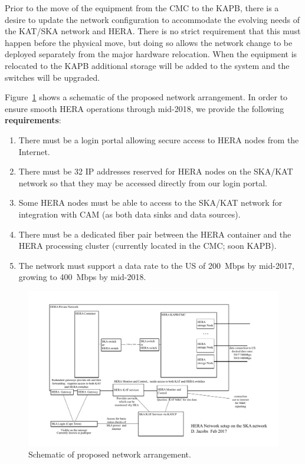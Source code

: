 \documentclass{article}
\begin{document}
Prior to the move of the equipment from the CMC to the KAPB, there is a desire
to update the network configuration to accommodate the evolving needs of the
KAT/SKA network and HERA.  There is no strict requirement that this must
happen before the physical move, but doing so allows the network change to be
deployed separately from the major hardware relocation.  When the equipment is relocated to the KAPB additional storage will be added to the system and the switches will be upgraded.


Figure~\ref{fig:net_org} shows a schematic of the proposed network arrangement. In order to ensure smooth HERA operations through mid-2018, we provide the following \textbf{requirements}:

\begin{enumerate}
\item There must be a login portal allowing secure access to HERA nodes from the Internet.
\item There must be 32 IP addresses reserved for HERA nodes on the SKA/KAT network so that they may be accessed directly from our login portal.
\item Some HERA nodes must be able to access to the SKA/KAT network for integration with CAM (as both data sinks and data sources).
\item There must be a dedicated fiber pair between the HERA container and the HERA processing cluster (currently located in the CMC; soon KAPB).
\item The network must support a data rate to the US of 200~Mbps by mid-2017, growing to 400~Mbps by mid-2018.
\end{enumerate}

\begin{figure}[H]
\includegraphics[width=\textwidth]{HERA_2017_network_organization.pdf}
\centering
\caption{Schematic of proposed network arrangement.}
\label{fig:net_org}
\end{figure}
\end{document}
